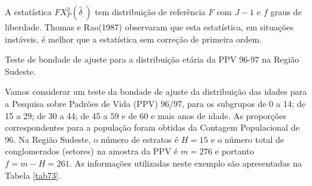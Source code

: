 \documentclass[]{book}
\numberwithin{example}{chapter}
\numberwithin{remark}{chapter}
\numberwithin{definition}{chapter}
\let\BeginKnitrBlock\begin \let\EndKnitrBlock\end
\begin{document}
A estatística \(FX_{P}^{2}\left( \hat{\delta}_{.}\right)\) tem
distribuição de referência \(F\) com \(J-1\) e \(f\) graus de liberdade.
Thomas e Rao(1987) observaram que esta estatística, em situações
instáveis, é melhor que a estatística sem correção de primeira ordem.

\BeginKnitrBlock{example}
\protect\hypertarget{ex:unnamed-chunk-101}{}{\label{ex:unnamed-chunk-101}}Teste
de bondade de ajuste para a distribuição etária da PPV 96-97 na Região
Sudeste.
\EndKnitrBlock{example}

Vamos considerar um teste da bondade de ajuste da distribuição das
idades para a Pesquisa sobre Padrões de Vida (PPV) 96/97, para os
subgrupos de 0 a 14; de 15 a 29; de 30 a 44; de 45 a 59 e de 60 e mais
anos de idade. As proporções correspondentes para a população foram
obtidas da Contagem Populacional de 96. Na Região Sudeste, o número de
estratos é \(H=15\) e o número total de conglomerados (setores) na
amostra da PPV é \(m=276\) e portanto \(f=m-H=261\). As informações
utilizadas neste exemplo são apresentadas na Tabela \ref{tab73}.
\end{document}
